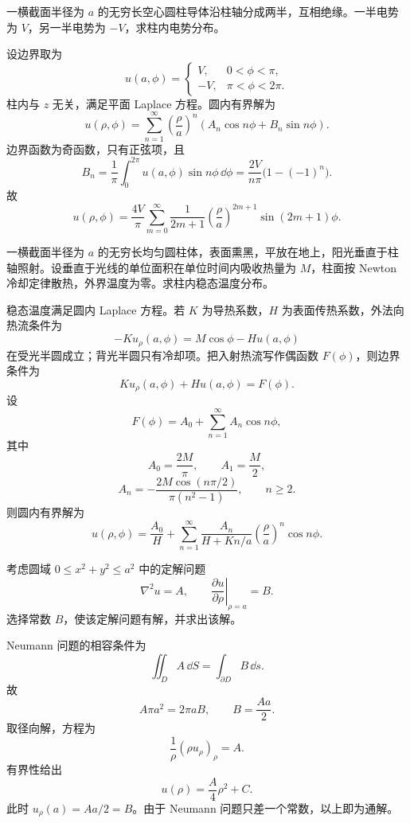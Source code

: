 ﻿


\begin{question}
一横截面半径为 \(a\) 的无穷长空心圆柱导体沿柱轴分成两半，互相绝缘。一半电势为 \(V\)，另一半电势为 \(-V\)，求柱内电势分布。

\begin{solution}
设边界取为
\[
u(a,\phi)=
\begin{cases}
V,&0<\phi<\pi,\\
-V,&\pi<\phi<2\pi.
\end{cases}
\]
柱内与 \(z\) 无关，满足平面 Laplace 方程。圆内有界解为
\[
u(\rho,\phi)=\sum_{n=1}^{\infty}\left(\frac{\rho}{a}\right)^n
\left(A_n\cos n\phi+B_n\sin n\phi\right).
\]
边界函数为奇函数，只有正弦项，且
\[
B_n=\frac1\pi\int_0^{2\pi}u(a,\phi)\sin n\phi\,\dd{\phi}
=\frac{2V}{n\pi}\bigl(1-(-1)^n\bigr).
\]
故
\[
u(\rho,\phi)=\frac{4V}{\pi}\sum_{m=0}^{\infty}
\frac1{2m+1}\left(\frac{\rho}{a}\right)^{2m+1}
\sin(2m+1)\phi .
\]
\end{solution}
\end{question}

\begin{question}
一横截面半径为 \(a\) 的无穷长均匀圆柱体，表面熏黑，平放在地上，阳光垂直于柱轴照射。设垂直于光线的单位面积在单位时间内吸收热量为 \(M\)，柱面按 Newton 冷却定律散热，外界温度为零。求柱内稳态温度分布。

\begin{solution}
稳态温度满足圆内 Laplace 方程。若 \(K\) 为导热系数，\(H\) 为表面传热系数，外法向热流条件为
\[
-K u_\rho(a,\phi)=M\cos\phi-Hu(a,\phi)
\]
在受光半圆成立；背光半圆只有冷却项。把入射热流写作偶函数 \(F(\phi)\)，则边界条件为
\[
K u_\rho(a,\phi)+Hu(a,\phi)=F(\phi).
\]
设
\[
F(\phi)=A_0+\sum_{n=1}^{\infty}A_n\cos n\phi,
\]
其中
\[
A_0=\frac{2M}{\pi},\qquad
A_1=\frac{M}{2},
\]
\[
A_n=-\frac{2M\cos(n\pi/2)}{\pi(n^2-1)},\qquad n\ge2.
\]
则圆内有界解为
\[
u(\rho,\phi)=\frac{A_0}{H}
+\sum_{n=1}^{\infty}
\frac{A_n}{H+Kn/a}
\left(\frac{\rho}{a}\right)^n\cos n\phi .
\]
\end{solution}
\end{question}

\begin{question}
考虑圆域 \(0\le x^2+y^2\le a^2\) 中的定解问题
\[
\nabla^2u=A,\qquad
\left.\frac{\partial u}{\partial\rho}\right|_{\rho=a}=B.
\]
选择常数 \(B\)，使该定解问题有解，并求出该解。
\begin{solution}
Neumann 问题的相容条件为
\[
\iint_D A\,\dd{S}=\int_{\partial D}B\,\dd{s}.
\]
故
\[
A\pi a^2=2\pi aB,\qquad B=\frac{Aa}{2}.
\]
取径向解，方程为
\[
\frac1\rho(\rho u_\rho)_\rho=A.
\]
有界性给出
\[
u(\rho)=\frac{A}{4}\rho^2+C.
\]
此时 \(u_\rho(a)=Aa/2=B\)。由于 Neumann 问题只差一个常数，以上即为通解。
\end{solution}
\end{question}

